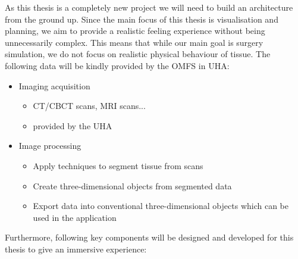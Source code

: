 As this thesis is a completely new project we will need to build an architecture from the ground up.
Since the main focus of this thesis is visualisation and planning, we aim to provide a realistic feeling experience without being unnecessarily complex.
This means that while our main goal is surgery simulation, we do not focus on realistic physical behaviour of tissue.
The following data will be kindly provided by the OMFS in UHA:
\begin{itemize}
    \item Imaging acquisition
    \begin{itemize}
        \item CT/CBCT scans, MRI scans...
        \item provided by the UHA
    \end{itemize}
\item Image processing
    \begin{itemize}
        \item Apply techniques to segment tissue from scans
        \item Create three-dimensional objects from segmented data
        \item Export data into conventional three-dimensional objects which can be used in the application
    \end{itemize}
\end{itemize}

Furthermore, following key components will be designed and developed for this thesis to give an immersive experience:

